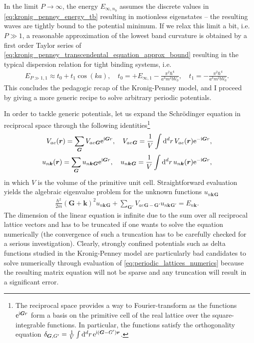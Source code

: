 In the limit $P\rightarrow\infty$, the energy $E_{\infty,n_b}$ assumes the discrete values in \cref{eq:kronig_penney_energy_tb} resulting in motionless eigenstates -- the resulting waves are tightly bound to the potential minimum.
If we relax this limit a bit, i.e. $P\gg 1$, a reasonable approximation of the lowest band curvature is obtained by a first order Taylor series of \cref{eq:kronig_penney_transcendental_equation_approx_bound} resulting in the typical dispersion relation for tight binding systems, i.e.
\begin{align}
    E_{P\gg1,1}\approx t_0 + t_1 \cos(k a),
    \quad
    t_0 = + E_{\infty,1} - \frac{\pi^2 \hbar^4}{a^3 m^2 b V_0},
    \quad
    t_1 = -\frac{\pi^2\hbar^4}{a^3 m^2 bV_0}.
    \label{eq:kronig_penney_tight_binding_dispersion}
\end{align}
This concludes the pedagogic recap of the Kronig-Penney model, and I proceed by giving a more generic recipe to solve arbitrary periodic potentials.

In order to tackle generic potentials, let us expand the Schrödinger equation in reciprocal space through the following identities\footnote{The reciprocal space provides a way to Fourier-transform as the functions $\mathrm e^{\mathrm i {\bm G r}}$ form a basis on the primitive cell of the real lattice over the square-integrable functions. In particular, the functions satisfy the orthogonality equation $\delta_{\bm G, G'}=\frac1{V}\int\mathrm d^dr\,\mathrm e^{\mathrm i({\bm G-G'}){\bm r}}$.}
\begin{align}
    V_{ae}({\bm r}) = \sum_{\bm G}V_{ae}{}_{\bm G}\mathrm e^{\mathrm i {\bm G r}},
    \quad
    V_{ae}{}_{\bm G} = \frac1{V}\int\mathrm d^dr\,V_{ae}({\bm r})\mathrm e^{-\mathrm i {\bm G r}},
    \\
    u_{n{\bm k}}({\bm r}) = \sum_{\bm G}u_{n{\bm k}}{}_{\bm G}\mathrm e^{\mathrm i {\bm G r}},
    \quad
    u_{n{\bm k}}{}_{\bm G} = \frac1{V}\int\mathrm d^dr\,u_{n{\bm k}}({\bm r})\mathrm e^{-\mathrm i {\bm G r}},
\end{align}
in which $V$ is the volume of the primitive unit cell.
Straightforward evaluation yields the algebraic eigenvalue problem for the unknown functions $u_{n{\bm k}}{}_{\bm G}$
\begin{align}
    \frac{\hbar^2}{2m}({\bm G}+{\bm k})^2u_{n{\bm k}}{}_{\bm G}+\sum_{\bm G'}V_{ae}{}_{\bm G-\bm G'}u_{n{\bm k}}{}_{\bm G'} = E_{n{\bm k}}.
    \label{eq:periodic_lattices_numerics}
\end{align}
The dimension of the linear equation is infinite due to the sum over all reciprocal lattice vectors and has to be truncated if one wants to solve the equation numerically (the convergence of such a truncation has to be carefully checked for a serious investigation).
Clearly, strongly confined potentials such as delta functions studied in the Kronig-Penney model are particularly bad candidates to solve numerically through evaluation of \cref{eq:periodic_lattices_numerics} because the resulting matrix equation will not be sparse and any truncation will result in a significant error.
%
%
